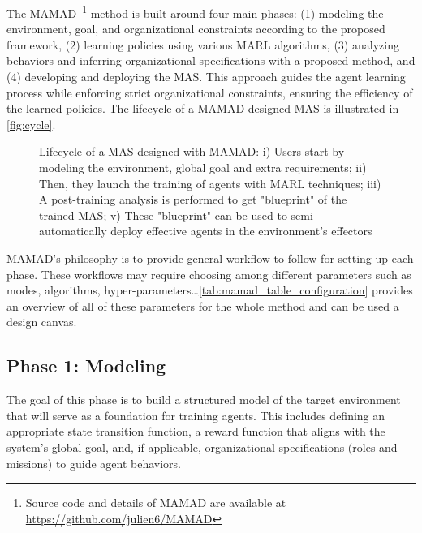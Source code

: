 \documentclass[pdflatex,sn-mathphys-num]{sn-jnl}%
\theoremstyle{thmstyleone}%
\theoremstyle{thmstyletwo}%
\theoremstyle{thmstylethree}%
\begin{document}
The MAMAD~\footnote{Source code and details of MAMAD are available at \url{https://github.com/julien6/MAMAD}} method is built around four main phases: (1) modeling the environment, goal, and organizational constraints according to the proposed framework, (2) learning policies using various MARL algorithms, (3) analyzing behaviors and inferring organizational specifications with a proposed method, and (4) developing and deploying the MAS. This approach guides the agent learning process while enforcing strict organizational constraints, ensuring the efficiency of the learned policies. The lifecycle of a MAMAD-designed MAS is illustrated in \autoref{fig:cycle}.


\begin{figure}[h!]
    \centering
    
    \caption{Lifecycle of a MAS designed with MAMAD: i) Users start by modeling the environment, global goal and extra requirements; \quad ii) Then, they launch the training of agents with MARL techniques; \quad iii) A post-training analysis is performed to get "blueprint" of the trained MAS; \quad v) These "blueprint" can be used to semi-automatically deploy effective agents in the environment's effectors}
    \label{fig:cycle}
\end{figure}

MAMAD's philosophy is to provide general workflow to follow for setting up each phase. These workflows may require choosing among different parameters such as modes, algorithms, hyper-parameters\dots \autoref{tab:mamad_table_configuration} provides an overview of all of these parameters for the whole method and can be used a design canvas.



\subsection{Phase 1: Modeling}

The goal of this phase is to build a structured model of the target environment that will serve as a foundation for training agents. This includes defining an appropriate state transition function, a reward function that aligns with the system's global goal, and, if applicable, organizational specifications (roles and missions) to guide agent behaviors.
\end{document}
